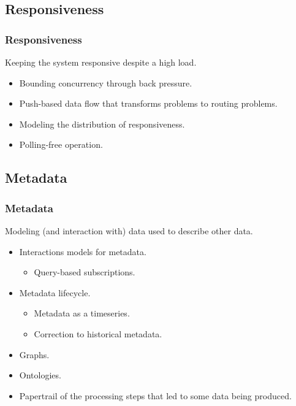 \subsection{Responsiveness}
\begin{frame}
    \frametitle{Responsiveness}
    \vspace{3mm}
    Keeping the system responsive despite a high load.
    \vspace{5mm}
    \begin{itemize}
        \item Bounding concurrency through back pressure.
        \item Push-based data flow that transforms problems to routing problems.
        \item Modeling the distribution of responsiveness.
        \item Polling-free operation.
    \end{itemize}
\end{frame}

\subsection{Metadata}
\begin{frame}
    \frametitle{Metadata}
    \vspace{0mm}
    Modeling (and interaction with) data used to describe other data.
    \vspace{2mm}
    \begin{itemize}
         The decision of \textsl{how} parts of a query against a metadata model are resolved can be taken dynamically, and be implemented by arbitrary logic. This can take physical state into account, or extend the set of available physical sensors (from the model) with virtual sensors that are spun up on demand.
        \item Interactions models for metadata.
          \begin{itemize}
            \item Query-based subscriptions.
          \end{itemize}
        \item Metadata lifecycle.
          \begin{itemize}
            \item Metadata as a timeseries.
            \item Correction to historical metadata.
          \end{itemize}
        \item Graphs.
        \item Ontologies.
        \item Papertrail of the processing steps that led to some data being produced.
    \end{itemize}
\end{frame}

